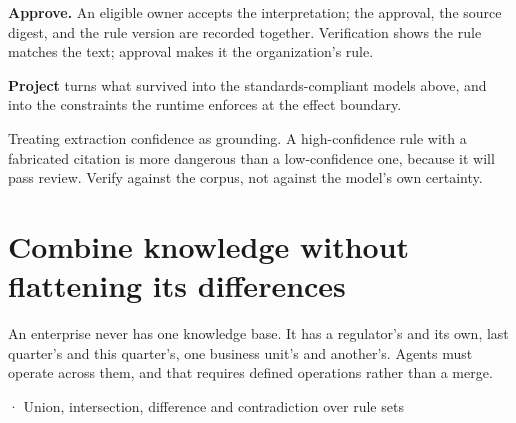 \textbf{Approve.} An eligible owner accepts the interpretation; the approval, the source digest, and the rule version are recorded together. Verification shows the rule matches the text; approval makes it the organization's rule.\par

\textbf{Project} turns what survived into the standards-compliant models above, and into the constraints the runtime enforces at the effect boundary.\par

\begin{bookantipattern}
Treating extraction confidence as grounding. A high-confidence rule with a fabricated citation is more dangerous than a low-confidence one, because it will pass review. Verify against the corpus, not against the model's own certainty.
\end{bookantipattern}

\section{Combine knowledge without flattening its differences}

An enterprise never has one knowledge base. It has a regulator's and its own, last quarter's and this quarter's, one business unit's and another's. Agents must operate across them, and that requires defined operations rather than a merge.\par

\BookSnake · Union, intersection, difference and contradiction over rule sets\par

